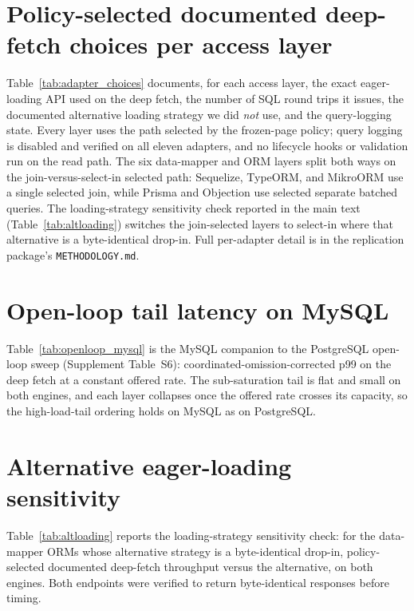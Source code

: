 \documentclass[11pt,a4paper]{article}
\newcommand{\tabledir}{tables/}
\begin{document}
\section{Policy-selected documented deep-fetch choices per access layer}
\label{sup:adapter-choices}
Table~\ref{tab:adapter_choices} documents, for each access layer, the exact
eager-loading API used on the deep fetch, the number of SQL round trips it
issues, the documented alternative loading strategy we did \emph{not} use, and the
query-logging state. Every layer uses the path selected by the frozen-page policy;
query logging is disabled and verified on all eleven adapters, and no lifecycle
hooks or validation run on the read path. The six data-mapper and ORM layers split
both ways on the join-versus-select-in selected path: Sequelize, TypeORM, and MikroORM
use a single selected join, while Prisma and Objection use selected separate batched
queries. The loading-strategy sensitivity check reported in the main text
(Table~\ref{tab:altloading}) switches the join-selected layers to select-in where
that alternative is a byte-identical drop-in. Full per-adapter detail is in the
replication package's \texttt{METHODOLOGY.md}.



\section{Open-loop tail latency on MySQL}
\label{sup:openloop-mysql}
Table~\ref{tab:openloop_mysql} is the MySQL companion to the PostgreSQL open-loop
sweep (Supplement Table~S6): coordinated-omission-corrected p99 on the deep
fetch at a constant offered rate. The sub-saturation tail is flat and small on
both engines, and each layer collapses once the offered rate crosses its capacity,
so the high-load-tail ordering holds on MySQL as on PostgreSQL.



\section{Alternative eager-loading sensitivity}
\label{sup:altloading}
Table~\ref{tab:altloading} reports the loading-strategy sensitivity check: for the
data-mapper ORMs whose alternative strategy is a byte-identical drop-in, policy-selected documented
deep-fetch throughput versus the alternative, on both engines. Both endpoints were
verified to return byte-identical responses before timing.
\end{document}
